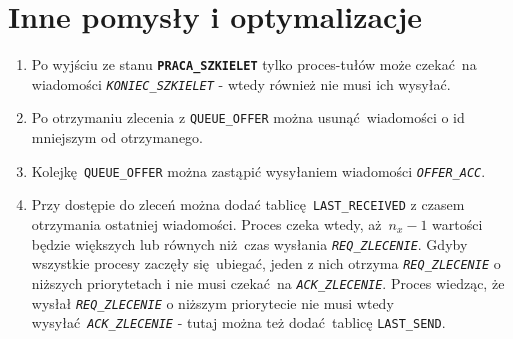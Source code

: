 \documentclass[12pt]{article}
\newcommand{\state}[1]{\texttt{\textbf{#1}}}
\newcommand{\msg}[1]{\texttt{\emph{#1}}}
\newcommand{\var}[1]{\texttt{#1}}
\begin{document}
\section{Inne pomysły i optymalizacje}
\begin{enumerate}
	\item Po wyjściu ze stanu \state{PRACA\_SZKIELET} tylko proces-tułów może czekać na wiadomości \msg{KONIEC\_SZKIELET} - wtedy również nie musi ich wysyłać.
	\item Po otrzymaniu zlecenia z \var{QUEUE\_OFFER} można usunąć wiadomości o id mniejszym od otrzymanego.
	\item Kolejkę \var{QUEUE\_OFFER} można zastąpić wysyłaniem wiadomości \msg{OFFER\_ACC}.
	\item Przy dostępie do zleceń można dodać tablicę \var{LAST\_RECEIVED} z czasem otrzymania ostatniej wiadomości. Proces czeka wtedy, aż $n_x - 1$ wartości będzie większych lub równych niż czas wysłania \msg{REQ\_ZLECENIE}. Gdyby wszystkie procesy zaczęły się ubiegać, jeden z nich otrzyma \msg{REQ\_ZLECENIE} o niższych priorytetach i nie musi czekać na \msg{ACK\_ZLECENIE}. Proces wiedząc, że wysłał \msg{REQ\_ZLECENIE} o niższym priorytecie nie musi wtedy wysyłać \msg{ACK\_ZLECENIE} - tutaj można też dodać tablicę \var{LAST\_SEND}.
\end{enumerate}
\end{document}
